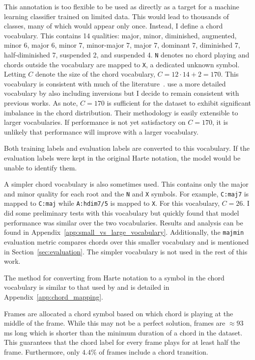 This annotation is too flexible to be used as directly as a target for a machine learning classifier trained on limited data. This would lead to thousands of classes, many of which would appear only once. Instead, I define a chord vocabulary. This contains 14 qualities: major, minor, diminished, augmented, minor 6, major 6, minor 7, minor-major 7, major 7, dominant 7, diminished 7, half-diminished 7, suspended 2, and suspended 4. \texttt{N} denotes no chord playing and chords outside the vocabulary are mapped to \texttt{X}, a dedicated unknown symbol. Letting $C$ denote the size of the chord vocabulary, $C=12\cdot14 + 2 = 170$. This vocabulary is consistent with much of the literature~\citep{StructuredTraining,FourTimelyInsights,ACRLargeVocab1}. \citet{ACRLargeVocab1} use a more detailed vocabulary by also including inversions but I decide to remain consistent with previous works. As \citet{StructuredTraining} note, $C=170$ is sufficient for the dataset to exhibit significant imbalance in the chord distribution. Their methodology is easily extensible to larger vocabularies. If performance is not yet satisfactory on $C=170$, it is unlikely that performance will improve with a larger vocabulary.

Both training labels and evaluation labels are converted to this vocabulary. If the evaluation labels were kept in the original Harte notation, the model would be unable to identify them.

A simpler chord vocabulary is also sometimes used. This contains only the major and minor quality for each root and the \texttt{N} and \texttt{X} symbols. For example, \texttt{C:maj7} is mapped to \texttt{C:maj} while \texttt{A:hdim7/5} is mapped to \texttt{X}. For this vocabulary, $C=26$. I did some preliminary tests with this vocabulary but quickly found that model performance was similar over the two vocabularies. Results and analysis can be found in Appendix~\ref{app:small_vs_large_vocabulary}. Additionally, the \texttt{majmin} evaluation metric compares chords over this smaller vocabulary and is mentioned in Section~\ref{sec:evaluation}. The simpler vocabulary is not used in the rest of this work.

The method for converting from Harte notation to a symbol in the chord vocabulary is similar to that used by \citet{StructuredTraining} and is detailed in Appendix~\ref{app:chord_mapping}.

Frames are allocated a chord symbol based on which chord is playing at the middle of the frame. While this may not be a perfect solution, frames are $\approx93$ms long which is shorter than the minimum duration of a chord in the dataset. This guarantees that the chord label for every frame plays for at least half the frame. Furthermore, only $4.4\%$ of frames include a chord transition.

